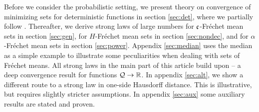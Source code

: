Before we consider the probabilistic setting, we present theory on convergence of minimizing sets for deterministic functions in section \ref{sec:det}, where we partially follow \cite{rockafellar98}. Thereafter, we derive strong laws of large numbers for $\mathfrak{c}$-Fréchet mean sets in section \ref{sec:gen}, for $H$-Fréchet mean sets in section \ref{sec:nondec}, and for $\alpha$-Fréchet mean sets in section \ref{sec:power}. 
Appendix \ref{sec:median} uses the median as a simple example to illustrate some peculiarities when dealing with sets of Fréchet means.
All strong laws in the main part of this article build upon \cite[Theorem 1.1]{korf01} -- a deep convergence result for functions $\mathcal{Q} \to \mathbb{R}$. In appendix \ref{sec:alt}, we show a different route to a strong law in one-side Hausdorff distance. This is illustrative, but requires slightly stricter assumptions. 
In appendix \ref{sec:aux} some auxiliary results are stated and proven.
%